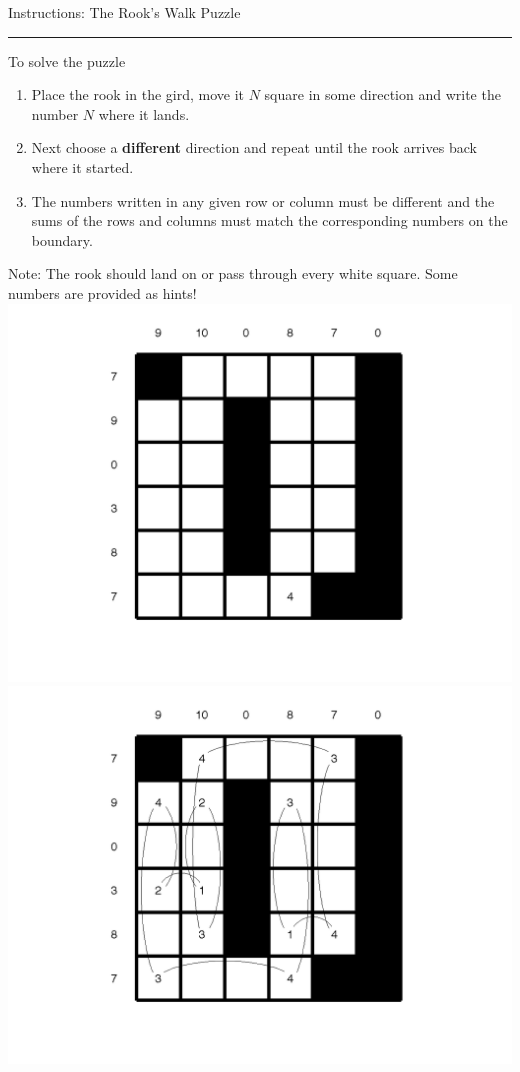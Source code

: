\documentclass[english]{article}
\begin{document}
\begin{center}

{\huge Instructions: The Rook's Walk Puzzle}{\huge \par}

\end{center}\rule[0.5ex]{1\columnwidth}{1pt}

\noindent To solve the puzzle
\begin{enumerate}
\item Place the rook in the gird, move it $N$ square in some direction and write the number $N$ where it lands.
\item 
Next choose a \textbf{different} direction and repeat until the rook arrives back where it started.
\item 
The numbers written in any given row or column must be different and the sums of the rows and columns must match the corresponding numbers on the boundary.
\end{enumerate}
Note: The rook should land on or pass through every white square. Some numbers are provided as hints!
\includegraphics[scale=0.4]{medium}\includegraphics[scale=0.4]{mediumsoln}
\end{document}
